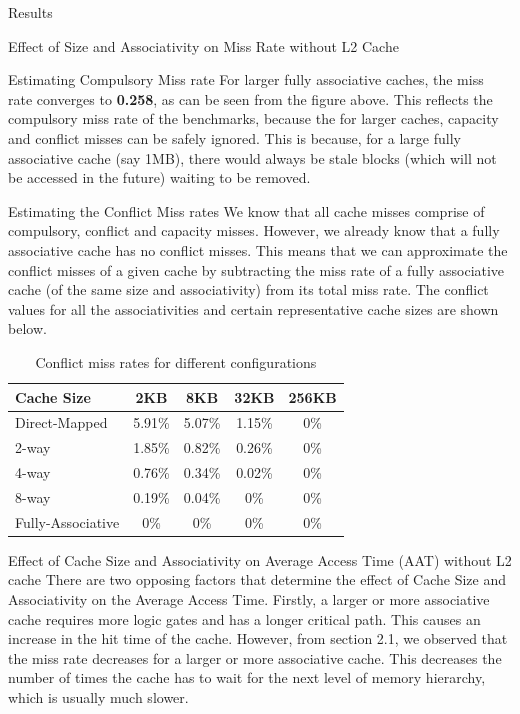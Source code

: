 \begin{section}{Results}
\begin{subsection}{Effect of Size and Associativity on Miss Rate without L2 Cache}
    \begin{subsubsection}{Estimating Compulsory Miss rate}
    For larger fully associative caches, the miss rate converges to \textbf{0.258}, as can be seen from the figure above. This reflects the compulsory miss rate  of the benchmarks, because the for larger caches, capacity and conflict misses can be safely ignored. This is because, for a large fully associative cache (say 1MB), there would always be stale blocks (which will not be accessed in the future) waiting to be removed. 
    \end{subsubsection}

    \begin{subsubsection}{Estimating the Conflict Miss rates}
    We know that all cache misses comprise of compulsory, conflict and capacity misses. However, we already know that a fully associative cache has no conflict misses. This means that we can approximate the conflict misses of a given cache by subtracting the miss rate of a fully associative cache (of the same size and associativity) from its total miss rate. The conflict values for all the associativities and certain representative cache sizes are shown below.

    \begin{table}[h!]
        \centering
        \begin{tabular}{lcccc}
            \toprule
            \textbf{Cache Size} & \textbf{2KB} & \textbf{8KB} & \textbf{32KB} & \textbf{256KB} \\
            \midrule
            Direct-Mapped  & 5.91\% & 5.07\% & 1.15\% & 0\%\\
            2-way  & 1.85\%  & 0.82\% & 0.26\% & 0\%\\
            4-way  & 0.76\%  & 0.34\% & 0.02\% & 0\%\\
            8-way  & 0.19\% & 0.04\%  & 0\% & 0\%\\
            Fully-Associative & 0\%  & 0\% & 0\% & 0\%\\
            \bottomrule
        \end{tabular}
        \caption{Conflict miss rates for different configurations}
        \label{tab:miss_rates}
    \end{table}

    \end{subsubsection}

    \end{subsection}

    \begin{subsection}{Effect of Cache Size and Associativity on Average Access Time (AAT) without L2 cache }
        There are two opposing factors that determine the effect of Cache Size and Associativity on the Average Access Time. Firstly, a larger or more associative cache requires more logic gates and has a longer critical path. This causes an increase in the hit time of the cache. However, from section 2.1, we observed that the miss rate decreases for a larger or more associative cache. This decreases the number of times the cache has to wait for the next level of memory hierarchy, which is usually much slower.


\end{subsection}
\end{section}

